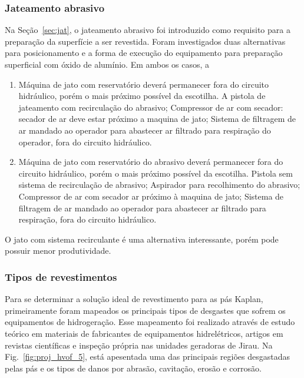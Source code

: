 \subsubsection{Jateamento abrasivo}

Na Seção~\ref{sec:jat}, o jateamento abrasivo foi introduzido como requisito
para a preparação da superfície a ser revestida. Foram investigados duas
alternativas para posicionamento e a forma de execução do equipamento
para preparação superficial com óxido de alumínio. Em ambos os casos, a 

\begin{enumerate}
  \item Máquina de jato com reservatório deverá permanecer fora do circuito
  hidráulico, porém o mais próximo possível da escotilha. A pistola de
  jateamento com recirculação do abrasivo; Compressor de ar com secador:
  secador de ar deve estar próximo a maquina de jato; Sistema de filtragem de
  ar mandado ao operador para abastecer ar filtrado para respiração
  do operador, fora do circuito hidráulico.
  \item Máquina de jato com reservatório do abrasivo deverá permanecer fora do
  circuito hidráulico, porém o mais próximo possível da escotilha. Pistola sem
  sistema de recirculação de abrasivo; Aspirador para recolhimento do abrasivo;
  Compressor de ar com secador ar próximo à maquina de jato; Sistema de
  filtragem de ar mandado ao operador para abastecer ar filtrado
  para respiração, fora do circuito hidráulico.
\end{enumerate}

O jato com sistema recirculante é uma alternativa interessante, porém pode
possuir menor produtividade.

\subsubsection{Tipos de revestimentos}

Para se determinar a solução ideal de revestimento para as pás Kaplan,
primeiramente foram mapeados os principais tipos de desgastes que sofrem os
equipamentos de hidrogeração. Esse mapeamento foi realizado através de estudo
teórico em materiais de fabricantes de equipamentos hidrelétricos, artigos em
revistas científicas e inspeção própria nas unidades geradoras de Jirau. Na
Fig.~\ref{fig:proj_hvof_5}, está apesentada uma das principais regiões
desgastadas pelas pás e os tipos de danos por abrasão, cavitação, erosão e corrosão.

